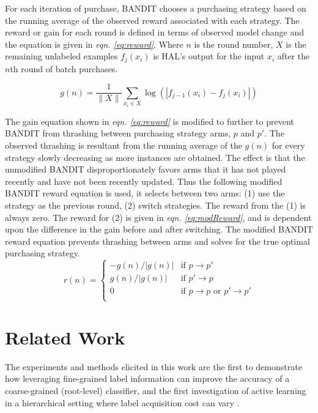 \documentclass[ms]{nuthesis}
\begin{document}
For each iteration of purchase, BANDIT chooses a purchasing strategy
based on the running average of the observed reward associated with
each strategy. The reward or gain for each round is defined in terms of
observed model change and the equation is given in
\textit{eqn. \ref{eq:reward}}. Where $n$ is the round number,
$X$ is the remaining unlabeled examples $f_{j}(x_i)$ is HAL's output for the
input $x_i$ after the $n$th round of batch purchases.

\begin{equation}
\label{eq:reward}
g(n) = \frac{1}{\|X\|}\sum_{x_i \in X} \log{(|f_{j-1}(x_i) - f_{j}(x_i)|)}
\end{equation}

The gain equation shown in \textit{eqn. \ref{eq:reward}} is modified to further
to prevent BANDIT from thrashing between purchasing strategy arms, $p$ and $p'$.
The observed thrashing is resultant from the running average of the $g(n)$
for every strategy slowly decreasing as more instances are obtained. The effect is
 that the unmodified BANDIT disproportionately favors arms that it has not played
  recently and have not been recently updated.
  Thus the following modified
  BANDIT reward equation is used, it selects between two arms: (1) use the
  strategy as the previous round, (2) switch strategies. The reward from the
  (1) is always zero. The reward for (2) is given in
  \textit{eqn. \ref{eq:modReward}}, and is dependent upon the difference
  in the gain before and after switching.
  The modified BANDIT reward
  equation prevents thrashing between arms and solves for the true optimal
  purchasing strategy.
\begin{equation}
\label{eq:modReward}
    r(n)=
\begin{cases}
   -g(n)/|g(n)| & \text{if } p \rightarrow p'\\
    g(n)/|g(n)| & \text{if } p' \rightarrow p\\
    0 & \text{if }  p \rightarrow  p \text{ or }  p' \rightarrow p' \\
\end{cases}
\end{equation}

\chapter{Related Work}
\par The experiments and methods elicited in this work
are the first to demonstrate how leveraging fine-grained label  information
can improve the accuracy of a coarse-grained (root-level) classifier, and the
 first investigation of active learning in a hierarchical setting where
 label acquisition cost can vary \cite{yugi}.
\end{document}
